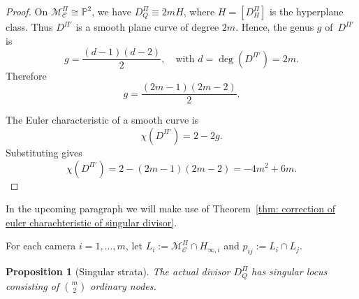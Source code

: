 \documentclass{article}
\newtheorem{proposition}{Proposition}
\newcommand{\PP}{\mathbb{P}}
\begin{document}
\begin{proof}
On $\mathcal{M}^\Pi_{\mathcal C}\cong \PP^2$, we have 
$D_Q^\Pi \equiv 2m H$, where $H=[D_H^\Pi]$ is the hyperplane class. Thus $D^{\Pi'}$ is a smooth plane curve of degree $2m$. Hence, the genus $g$ of~$D^{\Pi'}$ is
\[
g = \frac{(d-1)(d-2)}{2}, \quad \text{with } d = \deg(D^{\Pi'}) = 2m.
\]
Therefore
\[
g = \frac{(2m-1)(2m-2)}{2}.
\]

The Euler characteristic of a smooth curve is
\[
\chi(D^{\Pi'}) = 2 - 2g.
\]
Substituting gives
\[
\chi(D^{\Pi'}) = 2 - (2m-1)(2m-2) = -4m^2 + 6m.
\]
\end{proof}
In the upcoming paragraph we will make use of Theorem~\ref{thm: correction of euler charachteristic of singular divisor}. 

For each camera $i=1,\dots,m$, let $L_i:=\mathcal M^\Pi_{\mathcal C}\cap H_{\infty,i}$ and
$p_{ij}:=L_i\cap L_j$.

\begin{proposition}[Singular strata]\label{prop:sing-strata}
The actual divisor $D_Q^\Pi$ has singular locus consisting of $\binom{m}{2}$ ordinary nodes.
\end{proposition}
\end{document}
